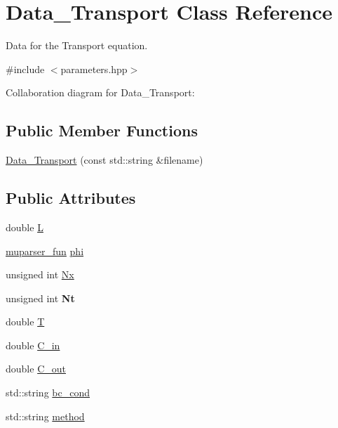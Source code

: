 \hypertarget{classData__Transport}{}\section{Data\+\_\+\+Transport Class Reference}
\label{classData__Transport}


Data for the Transport equation.  




{\ttfamily \#include $<$parameters.\+hpp$>$}



Collaboration diagram for Data\+\_\+\+Transport\+:
\subsection*{Public Member Functions}
\begin{DoxyCompactItemize}
\item 
\hyperlink{classData__Transport_a32766e6d540e05d518c9de22c00dc290}{Data\+\_\+\+Transport} (const std\+::string \&filename)
\end{DoxyCompactItemize}
\subsection*{Public Attributes}
\begin{DoxyCompactItemize}
\item 
double \hyperlink{classData__Transport_a5fa7473b6c53b7a6c217bb98ad018b3f}{L}
\item 
\hyperlink{classmuparser__fun}{muparser\+\_\+fun} \hyperlink{classData__Transport_af5032faf024d666c17b41cda75cabf2b}{phi}
\item 
unsigned int \hyperlink{classData__Transport_a1dbfd22dbcaaa6b152d2d5924a88ae48}{Nx}
\item 
\mbox{\label{classData__Transport_a2c9fff729baa391078482324d2ee860c}} 
unsigned int {\bfseries Nt}
\item 
double \hyperlink{classData__Transport_abf3c76b02af6f7a2ca96fa6299d00fec}{T}
\item 
double \hyperlink{classData__Transport_ab0ecc6cc8672b5c74dcb732baed443ca}{C\+\_\+in}
\item 
double \hyperlink{classData__Transport_ae538de71274b5c5c394cf1ab2595641a}{C\+\_\+out}
\item 
std\+::string \hyperlink{classData__Transport_a72f6bee03d1aa06b11004640e3d60ec1}{bc\+\_\+cond}
\item 
std\+::string \hyperlink{classData__Transport_a7a81d76b7f50e16143a10121db8c7e40}{method}
\end{DoxyCompactItemize}


